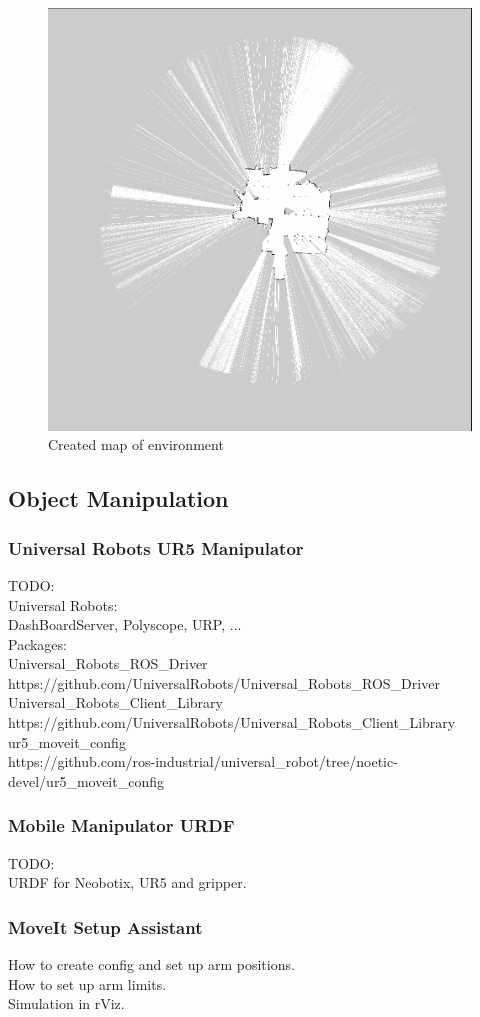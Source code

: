 \begin{figure}[h]
    \centering
    \includegraphics[width=0.5\linewidth]{map.png}
    \caption{Created map of environment}
    \label{fig:enter-label}
\end{figure}

\subsection{Object Manipulation}


\subsubsection{Universal Robots UR5 Manipulator}
TODO:\\
Universal Robots:\\
DashBoardServer, Polyscope, URP, ...\\

Packages:\\
Universal\_Robots\_ROS\_Driver
https://github.com/UniversalRobots/Universal\_Robots\_ROS\_Driver\\

Universal\_Robots\_Client\_Library\\
https://github.com/UniversalRobots/Universal\_Robots\_Client\_Library\\

ur5\_moveit\_config\\
https://github.com/ros-industrial/universal\_robot/tree/noetic-devel/ur5\_moveit\_config\\



\subsubsection{Mobile Manipulator URDF}
TODO:\\
URDF for Neobotix, UR5 and gripper.\\

\subsubsection{MoveIt Setup Assistant}
How to create config and set up arm positions.\\
How to set up arm limits.\\
Simulation in rViz.\\








